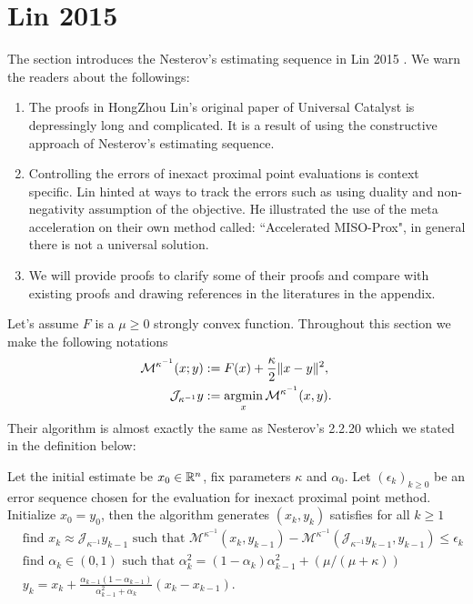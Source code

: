 \documentclass[12pt]{article}
\begin{document}
\section{Lin 2015}\label{sec:lin-2015}
    The section introduces the Nesterov's estimating sequence in Lin 2015 \cite{lin_universal_2015}. 
    We warn the readers about the followings: 
    \begin{enumerate}
        \item The proofs in HongZhou Lin's original paper of Universal Catalyst is depressingly long and complicated. It is a result of using the constructive approach of Nesterov's estimating sequence. 
        \item Controlling the errors of inexact proximal point evaluations is context specific. Lin hinted at ways to track the errors such as using duality and non-negativity assumption of the objective. He illustrated the use of the meta acceleration on their own method called: ``Accelerated MISO-Prox", in general there is not a universal solution. 
        \item We will provide proofs to clarify some of their proofs and compare with existing proofs and drawing references in the literatures in the appendix. 
    \end{enumerate}
    Let's assume $F$ is a $\mu \ge 0$ strongly convex function. 
    Throughout this section we make the following notations
    \begin{align*}
        \mathcal M^{\kappa^{-1}}(x; y) &:= F(x) + \frac{\kappa}{2}\Vert x - y\Vert^2, 
        \\
        \mathcal J_{\kappa^{-1}} y &:= \mathop{\rm argmin}\limits_x \mathcal M^{\kappa^{-1}} (x, y). 
    \end{align*}
    Their algorithm is almost exactly the same as Nesterov's 2.2.20 \cite{nesterov_lectures_2018} which we stated in the definition below: 
    \begin{definition}
        Let the initial estimate be $x_0 \in \mathbb R^n$, fix parameters $\kappa$ and $\alpha_0$. 
        Let $(\epsilon_k)_{k \ge 0}$ be an error sequence chosen for the evaluation for inexact proximal point method. 
        Initialize $x_0 = y_0$, then the algorithm generates $(x_k, y_k)$ satisfies for all $k \ge 1$
        \begin{align*}
            & \text{find } x_k \approx \mathcal J_{\kappa^{-1}} y_{k - 1} \text{ such that } \mathcal M^{\kappa^{-1}}(x_k, y_{k - 1}) - \mathcal M^{\kappa^{-1}}(\mathcal J_{\kappa^{-1}}y_{k - 1}, y_{k - 1}) \le \epsilon_k
            \\
            & \text{find } \alpha_k \in (0, 1) \text{ such that } \alpha_k^2 = (1 - \alpha_k)\alpha_{k - 1}^2 + (\mu/(\mu + \kappa)) 
            \\
            & 
            y_{k} = x_k + \frac{\alpha_{k - 1}(1 - \alpha_{k - 1})}{\alpha_{k - 1}^2 + \alpha_k}(x_k - x_{k - 1}). 
        \end{align*}
    \end{definition}
\end{document}
